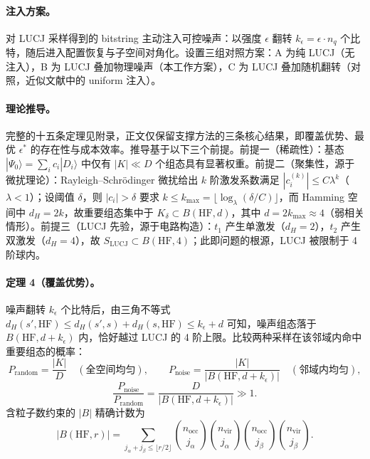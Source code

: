 \documentclass[UTF8,12pt,a4paper]{ctexart}
\begin{document}
\paragraph{注入方案。} 对 LUCJ 采样得到的 bitstring 主动注入可控噪声：以强度 $\epsilon$ 翻转 $k_\epsilon=\epsilon\cdot n_q$ 个比特，随后进入配置恢复与子空间对角化。设置三组对照方案：A 为纯 LUCJ（无注入），B 为 LUCJ 叠加物理噪声（本工作方案），C 为 LUCJ 叠加随机翻转（对照，近似文献中的 uniform 注入）。

\paragraph{理论推导。} 完整的十五条定理见附录，正文仅保留支撑方法的三条核心结果，即覆盖优势、最优 $\epsilon^*$ 的存在性与成本效率。推导基于以下三个前提。前提一（稀疏性）：基态 $|\Psi_0\rangle=\sum_i c_i|D_i\rangle$ 中仅有 $|K|\ll D$ 个组态具有显著权重。前提二（聚集性，源于微扰理论）：Rayleigh--Schr\"odinger 微扰给出 $k$ 阶激发系数满足 $|c_i^{(k)}|\le C\lambda^k$（$\lambda<1$）；设阈值 $\delta$，则 $|c_i|>\delta$ 要求 $k\le k_{\max}=\lfloor\log_\lambda(\delta/C)\rfloor$，而 Hamming 空间中 $d_H=2k$，故重要组态集中于 $K_\delta\subset B(\text{HF},d)$，其中 $d=2k_{\max}\approx4$（弱相关情形）。前提三（LUCJ 先验，源于电路构造）：$t_1$ 产生单激发（$d_H=2$），$t_2$ 产生双激发（$d_H=4$），故 $S_{\text{LUCJ}}\subset B(\text{HF},4)$；此即问题的根源，LUCJ 被限制于 4 阶球内。

\paragraph{定理 4（覆盖优势）。} 噪声翻转 $k_\epsilon$ 个比特后，由三角不等式 $d_H(s',\text{HF})\le d_H(s',s)+d_H(s,\text{HF})\le k_\epsilon+d$ 可知，噪声组态落于 $B(\text{HF},d+k_\epsilon)$ 内，恰好越过 LUCJ 的 4 阶上限。比较两种采样在该邻域内命中重要组态的概率：
\begin{equation}
P_{\text{random}}=\frac{|K|}{D}\quad(\text{全空间均匀}),\qquad P_{\text{noise}}=\frac{|K|}{|B(\text{HF},d+k_\epsilon)|}\quad(\text{邻域内均匀}),
\end{equation}
\begin{equation}
\frac{P_{\text{noise}}}{P_{\text{random}}}=\frac{D}{|B(\text{HF},d+k_\epsilon)|}\gg 1.
\end{equation}
含粒子数约束的 $|B|$ 精确计数为
\begin{equation}
|B(\text{HF},r)|=\sum_{j_\alpha+j_\beta\le\lfloor r/2\rfloor}\binom{n_{\text{occ}}}{j_\alpha}\binom{n_{\text{vir}}}{j_\alpha}\binom{n_{\text{occ}}}{j_\beta}\binom{n_{\text{vir}}}{j_\beta}.
\end{equation}
\end{document}
